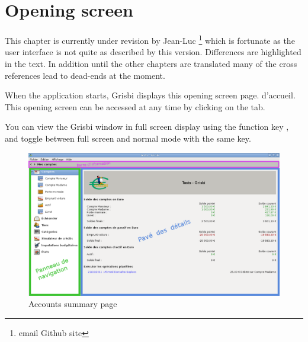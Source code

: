 
\chapter{Opening screen\label{home}}

 This chapter is currently under revision by {Jean-Luc }\footnote{email \urlJeanLucDuflotEmail{} Github site \urlJeanLucGit{}} which is fortunate as the user interface is not quite as described by this version.  Differences are highlighted in the text. In addition until the other chapters are translated many of the cross references lead to dead-ends at the moment.

When the application starts, Grisbi displays this
\ifIllustration opening screen  page.
\else d'accueil.
\fi
This opening screen can be accessed at any time by clicking on the   tab. 

You can view the Grisbi window in full screen display  using the function key , and toggle between full screen and normal mode with the same key.

\ifIllustration
\begin{figure}[htbp]
\begin{center}
\includegraphics[scale=0.35]{image/screenshot/home}
\end{center}
\caption{Accounts summary page}
\label{home-img}
\end{figure}
\fi

